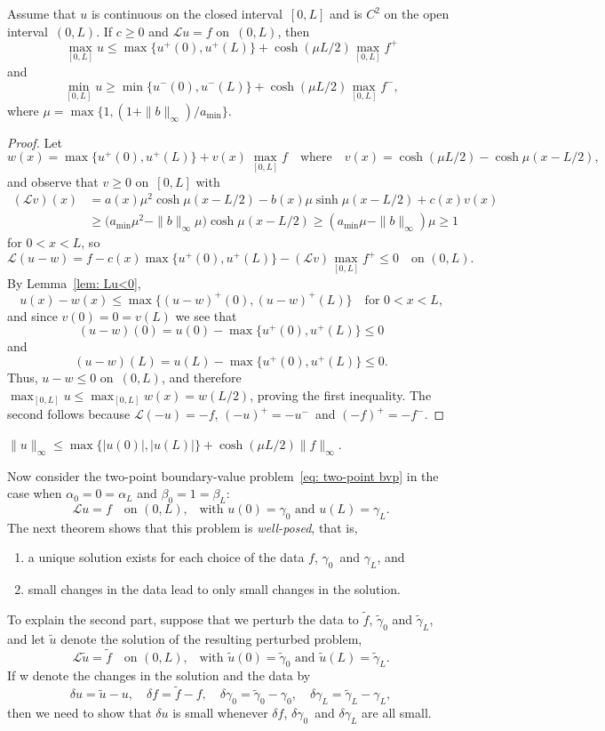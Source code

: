 \begin{theorem}
Assume that $u$ is continuous on the closed interval~$[0,L]$ and is $C^2$ on 
the open interval~$(0,L)$. If $c\ge0$ and $\mathcal{L}u=f$ on~$(0,L)$, then
\[
\max_{[0,L]}u\le\max\{u^+(0),u^+(L)\}+\cosh(\mu L/2)\max_{[0,L]}f^+
\]
and
\[
\min_{[0,L]}u\ge\min\{u^-(0),u^-(L)\}+\cosh(\mu L/2)\max_{[0,L]}f^-,
\]
where $\mu=\max\bigl\{1,(1+\|b\|_\infty)/a_{\min}\bigr\}$.
\end{theorem}
\begin{proof}
Let
\[
w(x)=\max\{u^+(0),u^+(L)\}+v(x)\,\max_{[0,L]}f
\quad\text{where}\quad
v(x)=\cosh(\mu L/2)-\cosh\mu(x-L/2),
\]
and observe that $v\ge0$ on~$[0,L]$ with
\begin{align*}
(\mathcal{L}v)(x)&=a(x)\mu^2\cosh\mu(x-L/2)
	-b(x)\mu\sinh\mu(x-L/2)+c(x)v(x)\\
	&\ge\bigl(a_{\min}\mu^2-\|b\|_\infty\mu\bigr)\cosh\mu(x-L/2)
	\ge(a_{\min}\mu-\|b\|_\infty)\mu\ge1
\end{align*}
for $0<x<L$, so
\[
\mathcal{L}(u-w)=f-c(x)\max\{u^+(0),u^+(L)\}-(\mathcal{L}v)\max_{[0,L]}f^+
	\le0\quad\text{on $(0,L)$.}
\]
By Lemma~\ref{lem: Lu<0},
\[
u(x)-w(x)\le\max\{(u-w)^+(0),(u-w)^+(L)\}\quad\text{for $0<x<L$,}
\]
and since $v(0)=0=v(L)$ we see that 
\[
(u-w)(0)=u(0)-\max\{u^+(0),u^+(L)\}\le0
\]
and
\[
(u-w)(L)=u(L)-\max\{u^+(0),u^+(L)\}\le0.
\]
Thus, $u-w\le0$ on~$(0,L)$, and therefore 
$\max_{[0,L]}u\le\max_{[0,L]}w(x)=w(L/2)$, proving the first inequality.  
The second follows because $\mathcal{L}(-u)=-f$, $(-u)^+=-u^-$~and
$(-f)^+=-f^-$.
\end{proof}
\begin{corollary}\label{cor: Lu=f apriori infty}
$\|u\|_\infty\le\max\{|u(0)|,|u(L)|\}+\cosh(\mu L/2)\|f\|_\infty$.
\end{corollary}

Now consider the two-point boundary-value problem~\eqref{eq: two-point bvp} in 
the case when $\alpha_0=0=\alpha_L$ and $\beta_0=1=\beta_L$:
\begin{equation}\label{eq: Lu=f Dirichlet}
\mathcal{L}u=f\quad\text{on $(0,L)$,}
	\quad\text{with $u(0)=\gamma_0$ and $u(L)=\gamma_L$.}
\end{equation}
The next theorem shows that this problem is \emph{well-posed}, that is,
\begin{enumerate}
\item a unique solution exists for each choice of the data $f$, $\gamma_0$~and 
$\gamma_L$, and 
\item small changes in the data lead to only small changes in the solution.
\end{enumerate}
To explain the second part, suppose that we perturb the data to $\tilde f$, 
$\tilde\gamma_0$ and $\tilde\gamma_L$, and let $\tilde u$ denote the solution 
of the resulting perturbed problem,
\[
\mathcal{L}\tilde u=\tilde f\quad\text{on $(0,L)$,}
	\quad\text{with $\tilde u(0)=\tilde\gamma_0$ 
and $\tilde u(L)=\tilde\gamma_L$.}
\]
If w denote the changes in the solution and the data by
\[
\delta u=\tilde u-u,\quad\delta f=\tilde f-f,\quad
\delta\gamma_0=\tilde\gamma_0-\gamma_0,\quad
\delta\gamma_L=\tilde\gamma_L-\gamma_L,
\]
then we need to show that $\delta u$ is small whenever $\delta f$, 
$\delta\gamma_0$~and $\delta\gamma_L$ are all small.

